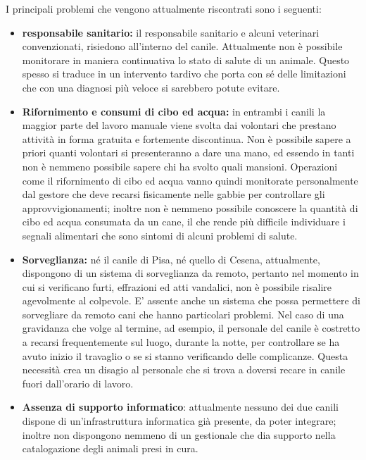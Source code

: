 I principali problemi che vengono attualmente riscontrati sono i seguenti:
\begin{itemize}
    \item \textbf{responsabile sanitario:} il responsabile sanitario e alcuni veterinari convenzionati, risiedono all'interno del canile.
    Attualmente non è possibile monitorare in maniera continuativa lo stato di salute di un animale. Questo spesso si traduce in un intervento tardivo che porta con sé delle limitazioni che con una diagnosi più veloce si sarebbero potute evitare.
    \item \textbf{Rifornimento e consumi di cibo ed acqua:} in entrambi i canili la maggior parte del lavoro manuale viene svolta dai volontari che prestano attività in forma gratuita e fortemente discontinua. Non è possibile sapere a priori quanti volontari si presenteranno a dare una mano, ed essendo in tanti non è nemmeno possibile sapere chi ha svolto quali mansioni. Operazioni come il rifornimento di cibo ed acqua vanno quindi monitorate personalmente dal gestore che deve recarsi fisicamente nelle gabbie per controllare gli approvvigionamenti; inoltre non è nemmeno possibile conoscere la quantità di cibo ed acqua consumata da un cane, il che rende più difficile individuare i segnali alimentari che sono sintomi di alcuni problemi di salute.
    \item \textbf{Sorveglianza:} né il canile di Pisa, né quello di Cesena, attualmente, dispongono di un sistema di sorveglianza da remoto, pertanto nel momento in cui si verificano furti, effrazioni ed atti vandalici, non è possibile risalire agevolmente al colpevole. E' assente anche un sistema che possa permettere di sorvegliare da remoto cani che hanno particolari problemi. Nel caso di una gravidanza che volge al termine, ad esempio, il personale del canile è costretto a recarsi frequentemente sul luogo, durante la notte, per controllare se ha avuto inizio il travaglio o se si stanno verificando delle complicanze. Questa necessità crea un disagio al personale che si trova a doversi recare in canile fuori dall'orario di lavoro.
    
    \item \textbf{Assenza di supporto informatico}: attualmente nessuno dei due canili dispone di un'infrastruttura informatica già presente, da poter integrare; inoltre non dispongono nemmeno di un gestionale che dia supporto nella catalogazione degli animali presi in cura.
\end{itemize}
 




